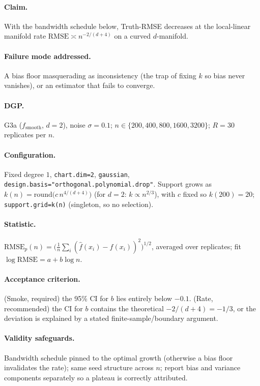 \documentclass[11pt]{article}
\newcommand{\code}[1]{\texttt{#1}}
\newcommand{\rmse}{\mathrm{RMSE}}
\begin{document}
\paragraph{Claim.} With the bandwidth schedule below, Truth-RMSE decreases at the local-linear
manifold rate $\rmse \asymp n^{-2/(d+4)}$ on a curved $d$-manifold.

\paragraph{Failure mode addressed.} A bias floor masquerading as inconsistency (the trap of
fixing $k$ so bias never vanishes), or an estimator that fails to converge.

\paragraph{DGP.} G3a ($f_{\mathrm{smooth}}$, $d=2$), noise $\sigma=0.1$;
$n\in\{200,400,800,1600,3200\}$; $R=30$ replicates per $n$.

\paragraph{Configuration.} Fixed degree $1$, \code{chart.dim=2}, \code{gaussian},
\code{design.basis="orthogonal.polynomial.drop"}. Support grows as
$k(n)=\mathrm{round}\!\big(c\,n^{4/(d+4)}\big)$ (for $d=2$: $k\propto n^{2/3}$), with $c$ fixed
so $k(200)=20$; \code{support.grid=k(n)} (singleton, so no selection).

\paragraph{Statistic.} $\rmse_p(n)=\big(\tfrac1n\sum_i(\hat f(x_i)-f(x_i))^2\big)^{1/2}$,
averaged over replicates; fit $\log \rmse = a + b\log n$.

\paragraph{Acceptance criterion.} (Smoke, required) the 95\% CI for $b$ lies entirely below
$-0.1$. (Rate, recommended) the CI for $b$ contains the theoretical $-2/(d+4)=-1/3$, or the
deviation is explained by a stated finite-sample/boundary argument.

\paragraph{Validity safeguards.} Bandwidth schedule pinned to the optimal growth (otherwise a
bias floor invalidates the rate); same seed structure across $n$; report bias and variance
components separately so a plateau is correctly attributed.
\end{document}
